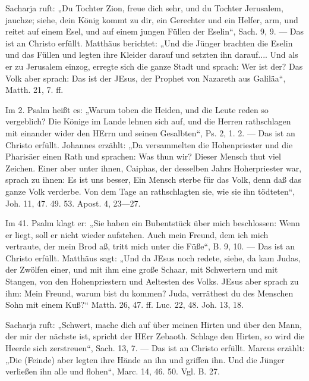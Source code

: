  Sacharja ruft: „Du Tochter Zion, freue dich sehr, und du Tochter Jerusalem, jauchze; siehe, dein König kommt zu dir, ein Gerechter und ein Helfer, arm, und reitet auf einem Esel, und auf einem jungen Füllen der Eselin“, Sach. 9, 9. — Das ist an Christo erfüllt. Matthäus berichtet: „Und die Jünger brachten die Eselin und das Füllen und legten ihre Kleider darauf und setzten ihn darauf.... Und als er zu Jerusalem einzog, erregte sich die ganze Stadt und sprach: Wer ist der? Das Volk aber sprach: Das ist der JEsus, der Prophet von Nazareth aus Galiläa“, Matth. 21, 7. ff.

 Im 2. Psalm heißt es: „Warum toben die Heiden, und die Leute reden so vergeblich? Die Könige im Lande lehnen sich auf, und die Herren rathschlagen mit einander wider den HErrn und seinen Gesalbten“, Ps. 2, 1. 2. — Das ist an Christo erfüllt. Johannes erzählt: „Da versammelten die Hohenpriester und die Pharisäer einen Rath und sprachen: Was thun wir? Dieser Mensch thut viel Zeichen. Einer aber unter ihnen, Caiphas, der desselben Jahrs Hoherpriester war, sprach zu ihnen: Es ist uns besser, Ein Mensch sterbe für das Volk, denn daß das ganze Volk verderbe. Von dem Tage an rathschlagten sie, wie sie ihn tödteten“, Joh. 11, 47. 49. 53. Apost. 4, 23—27.

 Im 41. Psalm klagt er: „Sie haben ein Bubentstück über mich beschlossen: Wenn er liegt, soll er nicht wieder aufstehen. Auch mein Freund, dem ich
mich vertraute, der mein Brod aß, tritt mich unter die Füße“, B. 9, 10. — Das ist an Christo erfüllt. Matthäus sagt: „Und da JEsus noch redete, siehe, da kam Judas, der Zwölfen einer, und mit ihm eine große Schaar, mit Schwertern und mit Stangen, von den Hohenpriestern und Aeltesten des Volks. JEsus aber sprach zu ihm: Mein Freund, warum bist du kommen? Juda, verräthest du des Menschen Sohn mit einem Kuß?“ Matth. 26, 47. ff. Luc. 22, 48. Joh. 13, 18.

 Sacharja ruft: „Schwert, mache dich auf über meinen Hirten und über den Mann, der mir der nächste ist, spricht der HErr Zebaoth. Schlage den Hirten, so wird die Heerde sich zerstreuen“, Sach. 13, 7. — Das ist an Christo erfüllt. Marcus erzählt: „Die (Feinde) aber legten ihre Hände an ihn und griffen ihn. Und die Jünger verließen ihn alle und flohen“, Marc. 14, 46. 50. Vgl. B. 27.

